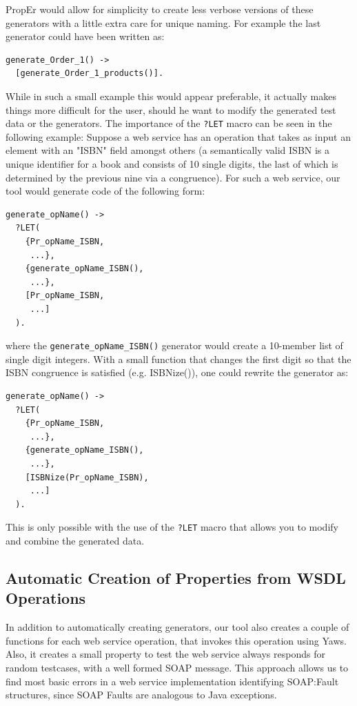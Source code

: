 \documentclass[submission,copyright,a4]{eptcs}
\newcommand{\LET}{\texttt{?LET}\xspace}
\begin{document}
PropEr would allow for simplicity to create less verbose versions of these generators 
with a little extra care for unique naming. For example the last generator could have 
been written as:

\begin{lstlisting}
generate_Order_1() ->
  [generate_Order_1_products()].
\end{lstlisting}

While in such a small example this would appear preferable, it actually makes things more 
difficult for the user, should he want to modify the generated test data or the generators. 
The importance of the \LET macro can be seen in the following example: Suppose a web service 
has an operation that takes as input an element with an "ISBN" field amongst others (a 
semantically valid ISBN is a unique identifier for a book and consists of 10 single digits, 
the last of which is determined by the previous nine via a congruence). For such a web service, 
our tool would generate code of the following form:
\begin{lstlisting}
generate_opName() ->
  ?LET(
    {Pr_opName_ISBN,
     ...},
    {generate_opName_ISBN(),
     ...},
    [Pr_opName_ISBN,
     ...]
  ).
\end{lstlisting}
where the \texttt{generate\_opName\_ISBN()} generator would create a
10-member list of single digit integers. With a small function that
changes the first digit so that the ISBN congruence is satisfied (e.g.
ISBNize()), one could rewrite the generator as:
\begin{lstlisting}
generate_opName() ->
  ?LET(
    {Pr_opName_ISBN,
     ...},
    {generate_opName_ISBN(),
     ...},
    [ISBNize(Pr_opName_ISBN),
     ...]
  ).
\end{lstlisting}

This is only possible with the use of the \LET macro that allows you to modify and combine the 
generated data. 

\subsection{Automatic Creation of Properties from WSDL Operations}

In addition to automatically creating generators, our tool also
creates a couple of functions for each web service operation, that
invokes this operation using Yaws. Also, it creates a small property
to test the web service always responds for random testcases, with a
well formed SOAP message. This approach allows us to find most basic
errors in a web service implementation identifying SOAP:Fault
structures, since SOAP Faults are analogous to Java exceptions.
\end{document}
